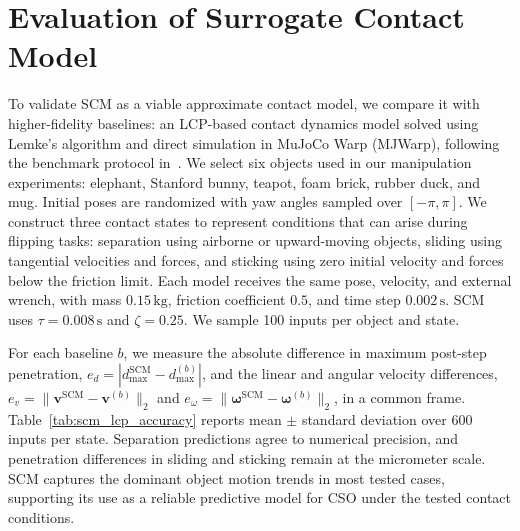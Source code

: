 \section{Evaluation of Surrogate Contact Model}
\label{sec:scm_evaluation}

To validate SCM as a viable approximate contact model, we compare it with higher-fidelity baselines: an LCP-based contact dynamics model solved using Lemke's algorithm and direct simulation in MuJoCo Warp (MJWarp), following the benchmark protocol in~\cite{borse2026comfree}. We select six objects used in our manipulation experiments: elephant, Stanford bunny, teapot, foam brick, rubber duck, and mug. Initial poses are randomized with yaw angles sampled over $[-\pi,\pi]$. We construct three contact states to represent conditions that can arise during flipping tasks: separation using airborne or upward-moving objects, sliding using tangential velocities and forces, and sticking using zero initial velocity and forces below the friction limit. Each model receives the same pose, velocity, and external wrench, with mass $0.15\,\mathrm{kg}$, friction coefficient $0.5$, and time step $0.002\,\mathrm{s}$. SCM uses $\tau=0.008\,\mathrm{s}$ and $\zeta=0.25$. We sample 100 inputs per object and state.

For each baseline $b$, we measure the absolute difference in maximum post-step penetration, $e_d=|d_{\max}^{\mathrm{SCM}}-d_{\max}^{(b)}|$, and the linear and angular velocity differences, $e_v=\|\boldsymbol{v}^{\mathrm{SCM}}-\boldsymbol{v}^{(b)}\|_2$ and $e_\omega=\|\boldsymbol{\omega}^{\mathrm{SCM}}-\boldsymbol{\omega}^{(b)}\|_2$, in a common frame. Table~\ref{tab:scm_lcp_accuracy} reports mean $\pm$ standard deviation over 600 inputs per state. Separation predictions agree to numerical precision, and penetration differences in sliding and sticking remain at the micrometer scale. SCM captures the dominant object motion trends in most tested cases, supporting its use as a reliable predictive model for CSO under the tested contact conditions.

